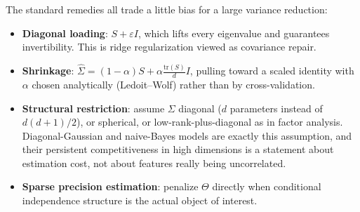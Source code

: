 \documentclass[conference]{IEEEtran}
\begin{document}
The standard remedies all trade a little bias for a large variance reduction:
\begin{itemize}
    \item \textbf{Diagonal loading}: $S + \varepsilon I$, which lifts every eigenvalue and guarantees invertibility. This is ridge regularization viewed as covariance repair.
    \item \textbf{Shrinkage}: $\hat{\Sigma} = (1-\alpha)S + \alpha \frac{\mathrm{tr}(S)}{d} I$, pulling toward a scaled identity with $\alpha$ chosen analytically (Ledoit--Wolf) rather than by cross-validation.
    \item \textbf{Structural restriction}: assume $\Sigma$ diagonal ($d$ parameters instead of $d(d+1)/2$), or spherical, or low-rank-plus-diagonal as in factor analysis. Diagonal-Gaussian and naive-Bayes models are exactly this assumption, and their persistent competitiveness in high dimensions is a statement about estimation cost, not about features really being uncorrelated.
    \item \textbf{Sparse precision estimation}: penalize $\Theta$ directly when conditional independence structure is the actual object of interest.
\end{itemize}
\end{document}
